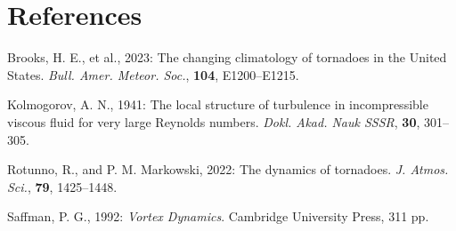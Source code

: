 \documentclass[11pt, a4paper]{article}
\begin{document}
\section*{References}
\begin{description}[font=\normalfont, leftmargin=0.5cm]
    \item Brooks, H. E., et al., 2023: The changing climatology of tornadoes in the United States. \textit{Bull. Amer. Meteor. Soc.}, \textbf{104}, E1200--E1215.
    \item Kolmogorov, A. N., 1941: The local structure of turbulence in incompressible viscous fluid for very large Reynolds numbers. \textit{Dokl. Akad. Nauk SSSR}, \textbf{30}, 301--305.
    \item Rotunno, R., and P. M. Markowski, 2022: The dynamics of tornadoes. \textit{J. Atmos. Sci.}, \textbf{79}, 1425--1448.
    \item Saffman, P. G., 1992: \textit{Vortex Dynamics}. Cambridge University Press, 311 pp.
\end{description}
\end{document}
